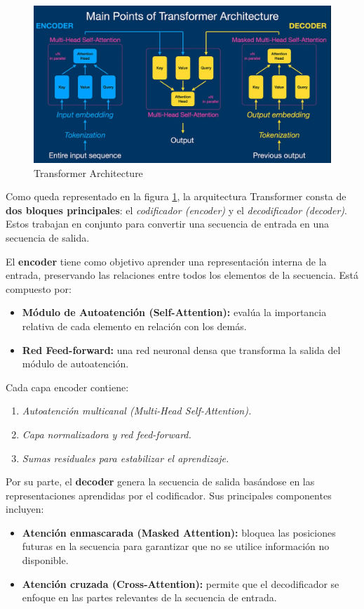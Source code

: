 \begin{figure}[H]
  \centering
  \includegraphics[width=1\textwidth]{images/transformer.png}
  \caption{Transformer Architecture}
  \label{fig:transformer}
\end{figure}

Como queda representado en la figura \ref{fig:transformer}, la arquitectura Transformer consta de \textbf{dos bloques principales}: el \textit{codificador (encoder)} y el \textit{decodificador (decoder)}. Estos trabajan en conjunto para convertir una secuencia de entrada en una secuencia de salida.

El \textbf{encoder} tiene como objetivo aprender una representación interna de la entrada, preservando las relaciones entre todos los elementos de la secuencia. Está compuesto por:
\begin{itemize}
    \item \textbf{Módulo de Autoatención (Self-Attention):} evalúa la importancia relativa de cada elemento en relación con los demás.
    \item \textbf{Red Feed-forward:} una red neuronal densa que transforma la salida del módulo de autoatención.
\end{itemize}

Cada capa encoder contiene:
\begin{enumerate}
    \item \textit{Autoatención multicanal (Multi-Head Self-Attention).}
    \item \textit{Capa normalizadora y red feed-forward.}
    \item \textit{Sumas residuales para estabilizar el aprendizaje.}
\end{enumerate}

Por su parte, el \textbf{decoder} genera la secuencia de salida basándose en las representaciones aprendidas por el codificador. Sus principales componentes incluyen:
\begin{itemize}
    \item \textbf{Atención enmascarada (Masked Attention):} bloquea las posiciones futuras en la secuencia para garantizar que no se utilice información no disponible.
    \item \textbf{Atención cruzada (Cross-Attention):} permite que el decodificador se enfoque en las partes relevantes de la secuencia de entrada.
\end{itemize}

